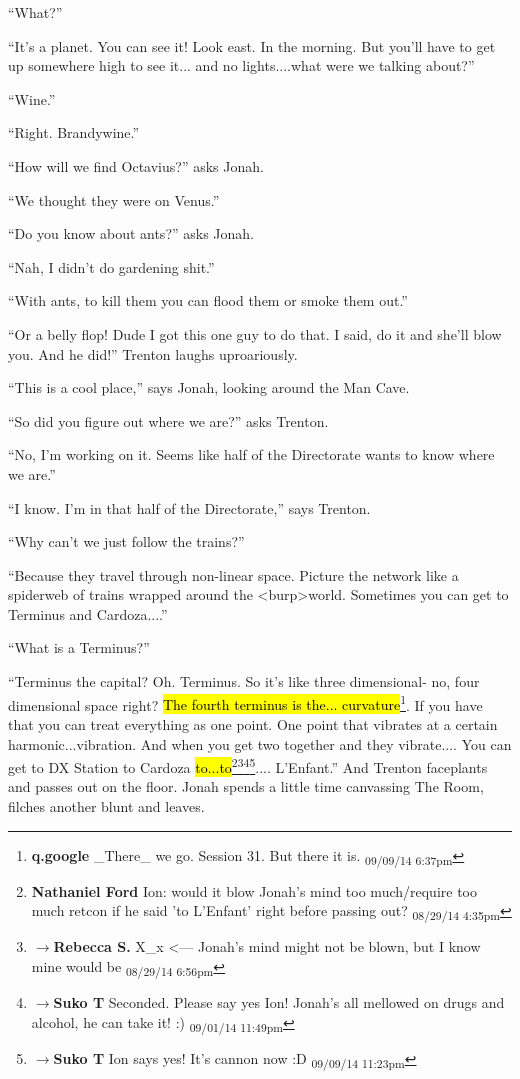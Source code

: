 ``What?''

``It's a planet.  You can see it!  Look east.  In the morning.  But you'll have to get up somewhere high to see it... and no lights....what were we talking about?''

``Wine.''

``Right.  Brandywine.''

``How will we find Octavius?'' asks Jonah.

``We thought they were on Venus.''

``Do you know about ants?'' asks Jonah.

``Nah, I didn't do gardening shit.''

``With ants, to kill them you can flood them or smoke them out.''

``Or a belly flop!  Dude I got this one guy to do that.  I said, do it and she'll blow you. And he did!'' Trenton laughs uproariously.

``This is a cool place,'' says Jonah, looking around the Man Cave.

``So did you figure out where we are?'' asks Trenton.

``No, I'm working on it.  Seems like half of the Directorate wants to know where we are.''

``I know.  I'm in that half of the Directorate,'' says Trenton.

``Why can't we just follow the trains?''

``Because they travel through non-linear space.  Picture the network like a spiderweb of trains wrapped around the \textless burp\textgreater  world.  Sometimes you can get to Terminus and Cardoza....''

``What is a Terminus?''

``Terminus the capital?  Oh.  Terminus.  So it's like three dimensional- no, four dimensional space right?  \hl{The fourth terminus is the... curvature}\footnote{\textbf{q.google }\_There\_ we go.  Session 31.  But there it is. \textsubscript{09/09/14 6:37pm}}.  If you have that you can treat everything as one point.  One point that vibrates at a certain harmonic...vibration.  And when you get two together and they vibrate.... You can get to DX Station to Cardoza \hl{to...to}\footnote{\textbf{Nathaniel Ford }Ion: would it blow Jonah's mind too much/require too much retcon if he said 'to L'Enfant' right before passing out? \textsubscript{08/29/14 4:35pm}}\footnote{$\rightarrow$\textbf{Rebecca S. }X\_x    \textless --- Jonah's mind might not be blown, but I know mine would be \textsubscript{08/29/14 6:56pm}}\footnote{$\rightarrow$\textbf{Suko T }Seconded.  Please say yes Ion!   Jonah's all mellowed on drugs and alcohol, he can take it! :) \textsubscript{09/01/14 11:49pm}}\footnote{$\rightarrow$\textbf{Suko T }Ion says yes!  It's cannon now :D \textsubscript{09/09/14 11:23pm}}.... L'Enfant.'' And Trenton faceplants and passes out on the floor.  Jonah spends a little time canvassing The Room, filches another blunt and leaves.



